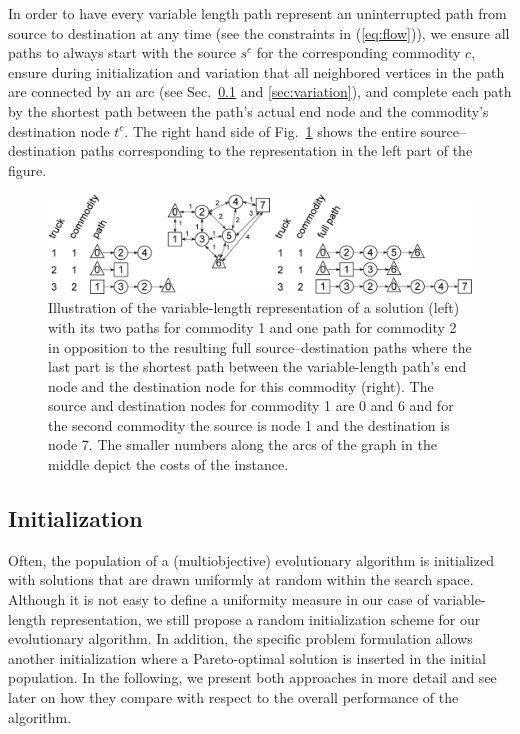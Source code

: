 \documentclass[preprint,12pt]{elsarticle}
\begin{document}
In order to have every variable length path represent an uninterrupted path from source to destination at any time (see the constraints in (\ref{eq:flow})), we ensure all paths to always start with the source $s^c$ for the corresponding commodity $c$, ensure during initialization and variation that all neighbored vertices in the path are connected by an arc (see Sec.~\ref{sec:init} and \ref{sec:variation}), and complete each path by the shortest path between the path's actual end node and the commodity's destination node $t^c$. The right hand side of Fig.~\ref{fig:paths} shows the entire source--destination paths corresponding to the representation in the left part of the figure. 

\begin{figure}%
\includegraphics[width=\columnwidth]{figs/truckpaths}%
\caption{\label{fig:paths} Illustration of the variable-length representation of a solution (left) with its two paths for commodity 1 and one path for commodity 2 in opposition to the resulting full source--destination paths where the last part is the shortest path between the variable-length path's end node and the destination node for this commodity (right). The source and destination nodes for commodity 1 are 0 and 6 and for the second commodity the source is node 1 and the destination is node 7. The smaller numbers along the arcs of the graph in the middle depict the costs of the instance.}
\end{figure}


\subsection{Initialization}\label{sec:init}
Often, the population of a (multiobjective) evolutionary algorithm is initialized with solutions that are drawn uniformly at random within the search space. Although it is not easy to define a uniformity measure in our case of variable-length representation, we still propose a random initialization scheme for our evolutionary algorithm. In addition, the specific problem formulation allows another initialization where a Pareto-optimal solution is inserted in the initial population. In the following, we present both approaches in more detail and see later on how they compare with respect to the overall performance of the algorithm.
\end{document}
